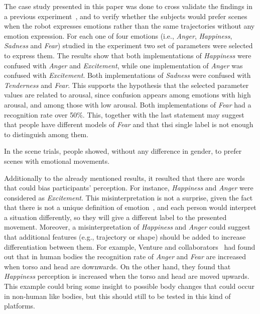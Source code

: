 The case study presented in this paper was done to cross validate the findings in a previous experiment~\cite{}, and to verify whether the subjects would prefer scenes when the robot expresses emotions rather than the same trajectories without any emotion expression. For each one of four emotions (i.e., \textit{Anger}, \textit{Happiness}, \textit{Sadness} and \textit{Fear}) studied in the experiment two set of parameters were selected to express them. The results show that both implementations of \textit{Happiness} were confused with \textit{Anger} and \textit{Excitement}, while one implementation of \textit{Anger} was confused with \textit{Excitement}. Both implementations of \textit{Sadness} were confused with \textit{Tenderness} and \textit{Fear}. This supports the hypothesis that the selected parameter values are related to arousal, since confusion appears among emotions with high arousal, and among those with low arousal. Both implementations of \textit{Fear} had a recognition rate over 50\%. This, together with the last statement may suggest that people have different models of \textit{Fear} and that thsi single label is not enough to distinguish among them. 

In the scene trials, people showed, without any difference in gender, to prefer scenes with emotional movements.

Additionally to the already mentioned results, it resulted that there are words that could bias participants' perception. For instance, \textit{Happiness} and \textit{Anger} were considered as \textit{Excitement}. This misinterpretation is not a surprise, given the fact that there is not a unique definition of emotion~\cite{Plutchik2001,cacioppo2000handbook}, and each person would interpret a situation differently, so they will give a different label to the presented movement. Moreover, a misinterpretation of \textit{Happiness} and \textit{Anger} could suggest that additional features (e.g., trajectory or shape) should be added to increase differentiation between them. For example, Venture and collaborators~\cite{Venture2014} had found out that in human bodies the recognition rate of \textit{Anger} and \textit{Fear} are increased when torso and head are downwards. On the other hand, they found that \textit{Happiness} perception is increased when the torso and head are moved upwards. This example could bring some insight to possible body changes that could occur in non-human like bodies, but this should still to be tested in this kind of platforms.
 
